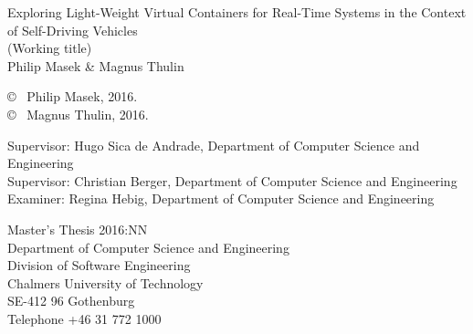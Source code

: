 \newpage
\thispagestyle{plain}
\vspace*{4.5cm}
Exploring Light-Weight Virtual Containers for Real-Time Systems in the Context of Self-Driving Vehicles\\
(Working title)\\
Philip Masek \& Magnus Thulin \setlength{\parskip}{1cm}

\copyright ~ Philip Masek, 2016. \setlength{\parskip}{1cm}\\[0.0cm]
\copyright ~ Magnus Thulin, 2016. \setlength{\parskip}{1cm}

Supervisor: Hugo Sica de Andrade, Department of Computer Science and Engineering\\Supervisor: Christian Berger, Department of Computer Science and Engineering\\
Examiner: Regina Hebig, Department of Computer Science and Engineering \setlength{\parskip}{1cm}

Master's Thesis 2016:NN\\	%
Department of Computer Science and Engineering\\
Division of Software Engineering\\
Chalmers University of Technology\\
SE-412 96 Gothenburg\\
Telephone +46 31 772 1000 \setlength{\parskip}{0.5cm}

\vfill
